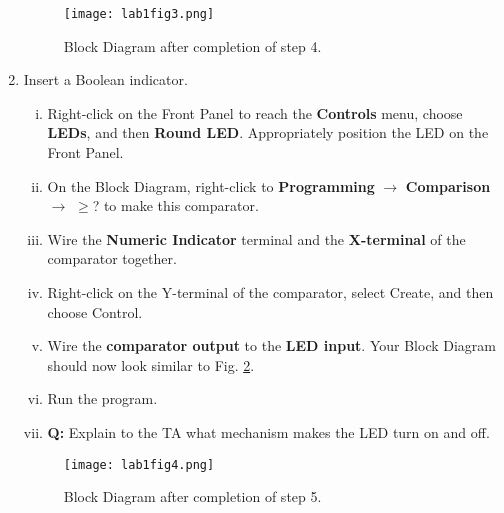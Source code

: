\documentclass[12pt]{article}
\begin{document}
\begin{enumerate}[1.]
	\begin{figure}[!ht]
	\begin{center}
	\texttt{[image: lab1fig3.png]}
	\caption{Block Diagram after completion of step 4.}
	\label{fig:3}
	\end{center}
	\end{figure}
	
	\item Insert a Boolean indicator.
	\begin{enumerate}[i.]
		\item Right-click on the Front Panel to reach the {\bf Controls} menu, choose {\bf LEDs}, and then
{\bf Round LED}. Appropriately position the LED on the Front Panel.
		\item On the Block Diagram, right-click to {\bf Programming} $\rightarrow$ {\bf Comparison} $\rightarrow$ $\mathbf{\geq}$? to make this comparator.
		\item Wire the {\bf Numeric Indicator} terminal and the {\bf X-terminal} of the comparator together.
		\item Right-click on the Y-terminal of the comparator, select Create, and then choose
Control.
		\item Wire the {\bf comparator output} to the {\bf LED input}. Your Block Diagram should now look similar to Fig. \ref{fig:4}.
		\item Run the program.
		\item {\bf Q:} Explain to the TA what mechanism makes the LED turn on and off.
	\end{enumerate}
	
	\begin{figure}[!ht]
	\begin{center}
	\texttt{[image: lab1fig4.png]}
	\caption{Block Diagram after completion of step 5.}
	\label{fig:4}
	\end{center}
	\end{figure}
	

\end{enumerate}
\end{document}
